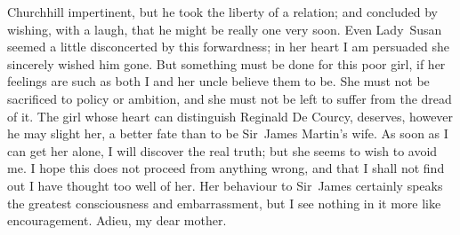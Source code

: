 \begin{mail}{Churchhill}{}
impertinent, but he took the liberty of a relation; and concluded by wishing, with a laugh, that he might be really one very soon. Even Lady~Susan seemed a little disconcerted by this forwardness; in her heart I am persuaded she sincerely wished him gone. But something must be done for this poor girl, if her feelings are such as both I and her uncle believe them to be. She must not be sacrificed to policy or ambition, and she must not be left to suffer from the dread of it. The girl whose heart can distinguish Reginald De Courcy, deserves, however he may slight her, a better fate than to be Sir~James Martin's wife. As soon as I can get her alone, I will discover the real truth; but she seems to wish to avoid me. I hope this does not proceed from anything wrong, and that I shall not find out I have thought too well of her. Her behaviour to Sir~James certainly speaks the greatest consciousness and embarrassment, but I see nothing in it more like encouragement. Adieu, my dear mother. 

\end{mail}